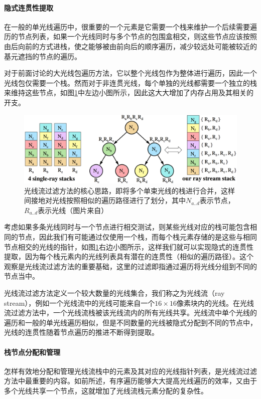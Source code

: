 \paragraph{隐式连贯性提取}
在一般的单光线遍历中，很重要的一个元素是它需要一个栈来维护一个后续需要遍历的节点列表，如果一个光线同时与多个节点的包围盒相交，则这些节点应该按照由后向前的方式进栈，使之能够被由前向后的顺序遍历，减少较远处可能被较近的基元遮挡的节点的遍历。

对于前面讨论的大光线包遍历方法，它以整个光线包作为整体进行遍历，因此一个光线包仅需要一个栈。然而对于非连贯光线，每个单独的光线都需要一个独立的栈来维持这些节点，如图\ref{f:pt-ray-stack}中左边小图所示，因此这大大增加了内存占用及其相关的开支。

\begin{figure}
	\includegraphics[width=1.\textwidth]{figures/pt/ray-stack}
	\caption{光线流过滤方法的核心思路，即将多个单束光线的栈进行合并，这样间接地对光线按照相似的遍历路径进行了划分，其中$N_{a..d}$表示节点，$R_{a..d}$表示光线（图片来自\cite{a:DynamicRayStreamTraversal}）}
	\label{f:pt-ray-stack}
\end{figure}

考虑如果多条光线同时与一个节点进行相交测试，则某些光线对应的栈可能包含相同的节点，因此我们有可能通过仅使用一个栈，而每个栈元素存储的是这些与相同节点相交的光线的指针，如图\ref{f:pt-ray-stack}右边小图所示，这样我们就可以实现隐式的连贯性提取，因为每个栈元素内的光线列表具有潜在的连贯性（相似的遍历路径）。这个观察是光线流过滤方法的重要基础，这里的过滤即指通过遍历将光线分组到不同的节点当中。

光线流过滤方法定义一个较大数量的光线集合，我们称之为光线流（ray stream），例如一个光线流中的光线可能来自一个$16\times 16$像素块内的光线。在光线流过滤方法中，一个光线流栈被该光线流内的所有光线共享。光线流中单个光线的遍历和一般的单光线遍历相似，但是不同数量的光线被隐式分配到不同的节点中，光线的连贯性随着节点遍历的推进不断得到提取。






\paragraph{栈节点分配和管理}
怎样有效地分配和管理光线流栈中的元素及其对应的光线指针列表，是光线流过滤方法中最重要的内容。如前所述，有序遍历能够大大提高光线遍历的效率，又由于多个光线共享一个节点，这就增加了光线流栈元素分配的复杂性。


